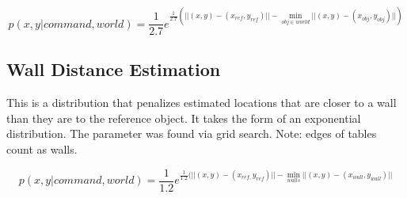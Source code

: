 \documentclass[12pt,letterpaper]{article}
\begin{document}
\[
p(x, y | command, world) = \frac{1}{2.7}e^{\frac{1}{2.7}(||(x, y) - (x_{ref}, y_{ref})|| - \min_{obj \in world} ||(x, y) - (x_{obj}, y_{obj})||)}
\]
\newpage
\subsection{Wall Distance Estimation}
This is a distribution that penalizes estimated locations that are closer to a wall than they are to the reference object. It takes the form of an exponential distribution. The parameter was found via grid search. Note: edges of tables count as walls.

\[
p(x, y | command, world) = \frac{1}{1.2}e^{\frac{1}{1.2}(||(x, y) - (x_{ref,} y_{ref})|| - \min_{walls} ||(x, y) - (x_{wall}, y_{wall})||}
\]
\end{document}

